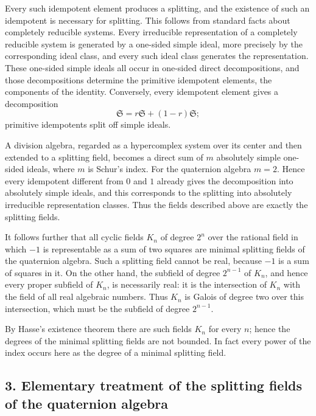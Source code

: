 \documentclass[11pt]{article}
\begin{document}
Every such idempotent element produces a splitting, and the existence of
such an idempotent is necessary for splitting. This follows from
standard facts about completely reducible systems. Every irreducible
representation of a completely reducible system is generated by a
one-sided simple ideal, more precisely by the corresponding ideal class,
and every such ideal class generates the representation. These one-sided
simple ideals all occur in one-sided direct decompositions, and those
decompositions determine the primitive idempotent elements, the
components of the identity. Conversely, every idempotent element gives a
decomposition \[
  \mathfrak S=r\mathfrak S+(1-r)\mathfrak S;
\] primitive idempotents split off simple ideals.

A division algebra, regarded as a hypercomplex system over its center
and then extended to a splitting field, becomes a direct sum of \(m\)
absolutely simple one-sided ideals, where \(m\) is Schur's index. For
the quaternion algebra \(m=2\). Hence every idempotent different from
\(0\) and \(1\) already gives the decomposition into absolutely simple
ideals, and this corresponds to the splitting into absolutely
irreducible representation classes. Thus the fields described above are
exactly the splitting fields.

It follows further that all cyclic fields \(K_n\) of degree \(2^n\) over
the rational field in which \(-1\) is representable as a sum of two
squares are minimal splitting fields of the quaternion algebra. Such a
splitting field cannot be real, because \(-1\) is a sum of squares in
it. On the other hand, the subfield of degree \(2^{n-1}\) of \(K_n\),
and hence every proper subfield of \(K_n\), is necessarily real: it is
the intersection of \(K_n\) with the field of all real algebraic
numbers. Thus \(K_n\) is Galois of degree two over this intersection,
which must be the subfield of degree \(2^{n-1}\).

By Hasse's existence theorem there are such fields \(K_n\) for every
\(n\); hence the degrees of the minimal splitting fields are not
bounded. In fact every power of the index occurs here as the degree of a
minimal splitting field.

\subsection{3. Elementary treatment of the splitting fields of the
quaternion
algebra}\label{elementary-treatment-of-the-splitting-fields-of-the-quaternion-algebra}
\end{document}
